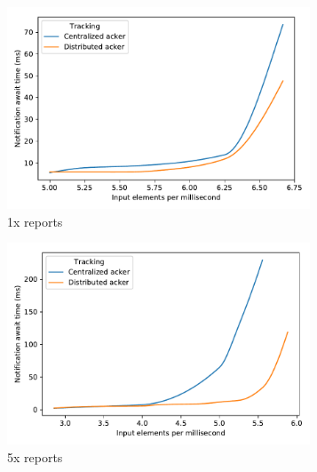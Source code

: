 \begin{figure}[t!]
    \begin{subfigure}[b]{0.30\textwidth}
            \includegraphics[width=0.99\textwidth]{pics/scalability_01x.pdf}
            \caption{1x reports}
            \label{1x_acks}
    \end{subfigure}
    \hspace{5mm}
    \begin{subfigure}[b]{0.30\textwidth}
            \includegraphics[width=0.99\textwidth]{pics/scalability_05x.pdf}
            \caption{5x reports}
            \label{5x_acks}
    \end{subfigure}
    \hspace{5mm}
    \begin{subfigure}[b]{0.30\textwidth}

\end{subfigure}
\end{figure}
